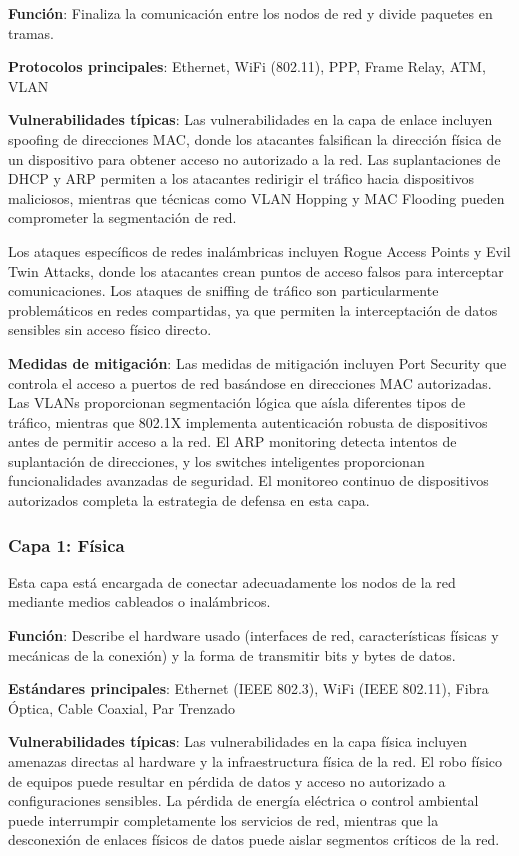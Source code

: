\begin{itemize}
\textbf{Función}: Finaliza la comunicación entre los nodos de red y divide paquetes en tramas.

\textbf{Protocolos principales}: Ethernet, WiFi (802.11), PPP, Frame Relay, ATM, VLAN

\textbf{Vulnerabilidades típicas}:
Las vulnerabilidades en la capa de enlace incluyen spoofing de direcciones MAC, donde los atacantes falsifican la dirección física de un dispositivo para obtener acceso no autorizado a la red. Las suplantaciones de DHCP y ARP permiten a los atacantes redirigir el tráfico hacia dispositivos maliciosos, mientras que técnicas como VLAN Hopping y MAC Flooding pueden comprometer la segmentación de red.

Los ataques específicos de redes inalámbricas incluyen Rogue Access Points y Evil Twin Attacks, donde los atacantes crean puntos de acceso falsos para interceptar comunicaciones. Los ataques de sniffing de tráfico son particularmente problemáticos en redes compartidas, ya que permiten la interceptación de datos sensibles sin acceso físico directo.

\textbf{Medidas de mitigación}:
Las medidas de mitigación incluyen Port Security que controla el acceso a puertos de red basándose en direcciones MAC autorizadas. Las VLANs proporcionan segmentación lógica que aísla diferentes tipos de tráfico, mientras que 802.1X implementa autenticación robusta de dispositivos antes de permitir acceso a la red. El ARP monitoring detecta intentos de suplantación de direcciones, y los switches inteligentes proporcionan funcionalidades avanzadas de seguridad. El monitoreo continuo de dispositivos autorizados completa la estrategia de defensa en esta capa.

\subsubsection{Capa 1: Física}

Esta capa está encargada de conectar adecuadamente los nodos de la red mediante medios cableados o inalámbricos.

\textbf{Función}: Describe el hardware usado (interfaces de red, características físicas y mecánicas de la conexión) y la forma de transmitir bits y bytes de datos.

\textbf{Estándares principales}: Ethernet (IEEE 802.3), WiFi (IEEE 802.11), Fibra Óptica, Cable Coaxial, Par Trenzado

\textbf{Vulnerabilidades típicas}:
Las vulnerabilidades en la capa física incluyen amenazas directas al hardware y la infraestructura física de la red. El robo físico de equipos puede resultar en pérdida de datos y acceso no autorizado a configuraciones sensibles. La pérdida de energía eléctrica o control ambiental puede interrumpir completamente los servicios de red, mientras que la desconexión de enlaces físicos de datos puede aislar segmentos críticos de la red.


\end{itemize}
